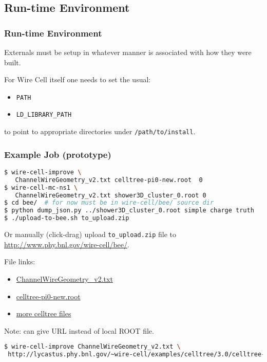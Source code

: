 \documentclass[xcolor=dvipsnames]{beamer}
\begin{document}
\subsection{Run-time Environment}

\begin{frame}[fragile]
  \frametitle{Run-time Environment}

  Externals must be setup in whatever manner is associated with how they were built.

  For Wire Cell itself one needs to set the usual:

  \begin{itemize}
  \item \verb|PATH|
  \item \verb|LD_LIBRARY_PATH|
  \end{itemize}

  to point to appropriate directories under \verb|/path/to/install|.

\end{frame}

\begin{frame}[fragile]
  \frametitle{Example Job (prototype)}
\begin{lstlisting}[language=sh]
$ wire-cell-improve \
   ChannelWireGeometry_v2.txt celltree-pi0-new.root  0
$ wire-cell-mc-ns1 \
   ChannelWireGeometry_v2.txt shower3D_cluster_0.root 0
$ cd bee/  # for now must be in wire-cell/bee/ source dir
$ python dump_json.py ../shower3D_cluster_0.root simple charge truth
$ ./upload-to-bee.sh to_upload.zip 
\end{lstlisting}

Or manually (click-drag) upload \texttt{to\_upload.zip} file to \url{http://www.phy.bnl.gov/wire-cell/bee/}.

  File links:
  \begin{itemize}
  \item \href{https://raw.githubusercontent.com/BNLIF/wire-cell-celltree/master/geometry/ChannelWireGeometry_v2.txt}{ChannelWireGeometry\_v2.txt}
  \item \href{http://www.phy.bnl.gov/wire-cell/examples/celltree/3.0/celltree-pi0-new.root}{celltree-pi0-new.root}
  \item \href{http://www.phy.bnl.gov/wire-cell/examples/celltree/}{more celltree files}
  \end{itemize}
  Note: can give URL instead of local ROOT file.

  \begin{lstlisting}[language=sh,basicstyle=\tiny]
$ wire-cell-improve ChannelWireGeometry_v2.txt \
 http://lycastus.phy.bnl.gov/~wire-cell/examples/celltree/3.0/celltree-pi0-new.root 0
  \end{lstlisting}
\end{frame}
\end{document}
